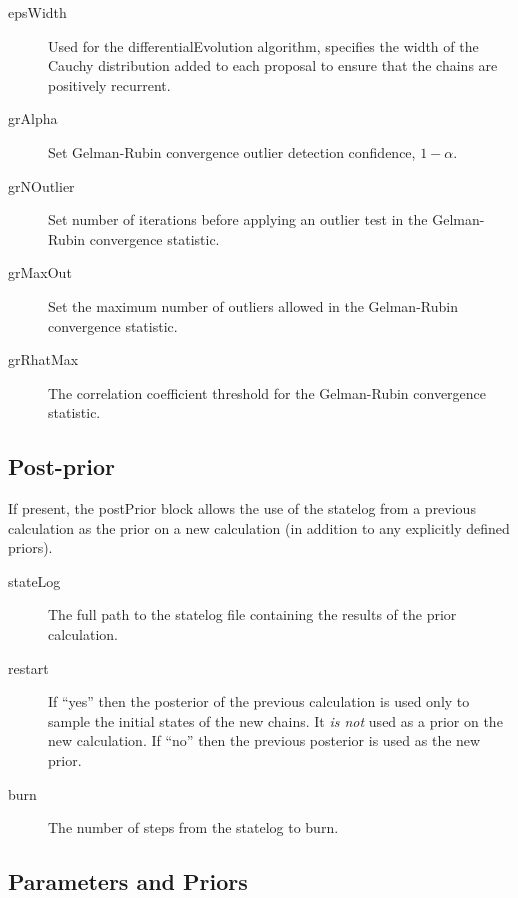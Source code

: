 \begin{description}
\begin{description}
\item[{\normalfont \ttfamily epsWidth}] Used for the {\normalfont \ttfamily differentialEvolution} algorithm, specifies the width of the Cauchy distribution added to each proposal to ensure that the chains are positively recurrent.
\item [{\normalfont \ttfamily grAlpha}] Set Gelman-Rubin convergence outlier detection confidence, $1-\alpha$.
\item [{\normalfont \ttfamily grNOutlier}] Set number of iterations before applying an outlier test in the Gelman-Rubin convergence statistic.
\item [{\normalfont \ttfamily grMaxOut}] Set the maximum number of outliers allowed in the Gelman-Rubin convergence statistic.
\item [{\normalfont \ttfamily grRhatMax}] The correlation coefficient threshold for the Gelman-Rubin convergence statistic.
\end{description}
\end{description}

\subsection{Post-prior}

If present, the {\normalfont \ttfamily postPrior} block allows the use of the statelog from a previous calculation as the prior on a new calculation (in addition to any explicitly defined priors). 

\begin{description}
 \item [{\normalfont \ttfamily stateLog}] The full path to the statelog file containing the results of the prior calculation.
 \item [{\normalfont \ttfamily restart}] If ``{\normalfont \ttfamily yes}'' then the posterior of the previous calculation is used only to sample the initial states of the new chains. It \emph{is not} used as a prior on the new calculation. If ``{\normalfont \ttfamily no}'' then the previous posterior is used as the new prior.
 \item [{\normalfont \ttfamily burn}] The number of steps from the statelog to burn.
\end{description}


\subsection{Parameters and Priors}

